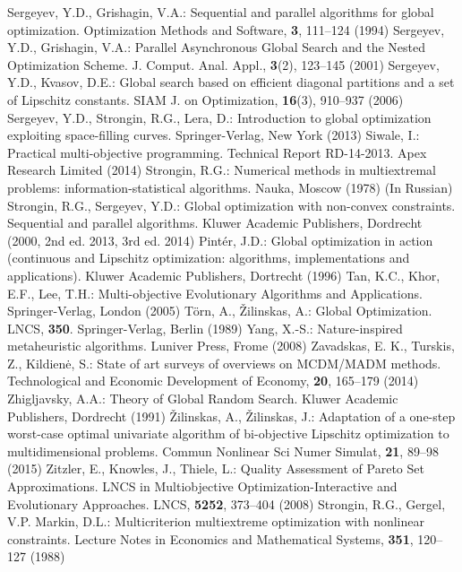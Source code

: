 \documentclass[smallcondensed]{svjour3}     %
\begin{document}
\begin{thebibliography}{}
	Sergeyev, Y.D., Grishagin, V.A.: Sequential and parallel algorithms for global optimization. Optimization Methods and Software, \textbf{3}, 111--124 (1994)
	Sergeyev, Y.D., Grishagin, V.A.: Parallel Asynchronous Global Search and the Nested Optimization Scheme. J. Comput. Anal. Appl., \textbf{3}(2), 123--145 (2001)
	Sergeyev, Y.D., Kvasov, D.E.: Global search based on efficient diagonal partitions and a set of Lipschitz constants. SIAM J. on Optimization, \textbf{16}(3), 910--937 (2006)
	Sergeyev, Y.D., Strongin, R.G., Lera, D.: Introduction to global optimization exploiting space-filling curves. Springer-Verlag, New York (2013)
	Siwale, I.: Practical multi-objective programming. Technical Report RD-14-2013. Apex Research Limited (2014)
	Strongin, R.G.: Numerical methods in multiextremal problems: information-statistical algorithms. Nauka, Moscow (1978) (In Russian)
	Strongin, R.G., Sergeyev, Y.D.: Global optimization with non-convex constraints. Sequential and parallel algorithms. Kluwer Academic Publishers, Dordrecht (2000, 2nd ed. 2013, 3rd ed. 2014)
	Pint{\'e}r, J.D.: Global optimization in action (continuous and Lipschitz optimization: algorithms, implementations and applications). Kluwer Academic Publishers, Dortrecht (1996)
	Tan, K.C., Khor, E.F., Lee, T.H.: Multi-objective Evolutionary Algorithms and Applications. Springer-Verlag, London (2005)
	T{\"o}rn, A., {\v Z}ilinskas, A.: Global Optimization. LNCS, \textbf{350}. Springer-Verlag, Berlin (1989)
	Yang, X.-S.: Nature-inspired metaheuristic algorithms. Luniver Press, Frome (2008)
	Zavadskas, E. K., Turskis, Z., Kildien{\.e}, S.: State of art surveys of overviews on MCDM/MADM methods. Technological and Economic Development of Economy, \textbf{20}, 165--179 (2014)
	Zhigljavsky, A.A.: Theory of Global Random Search. Kluwer Academic Publishers, Dordrecht (1991)
	{\v Z}ilinskas, A., {\v Z}ilinskas, J.: Adaptation of a one-step worst-case optimal univariate algorithm of bi-objective Lipschitz optimization to multidimensional problems. Commun Nonlinear Sci Numer Simulat, \textbf{21}, 89--98 (2015)
	Zitzler, E., Knowles, J., Thiele, L.: Quality Assessment of Pareto Set Approximations. LNCS in Multiobjective Optimization-Interactive and Evolutionary Approaches. LNCS, \textbf{5252}, 373--404 (2008)
	Strongin, R.G., Gergel, V.P. Markin, D.L.: Multicriterion multiextreme optimization with nonlinear constraints. Lecture Notes in Economics and Mathematical Systems, \textbf{351}, 120--127 (1988)

\end{thebibliography}
\end{document}
